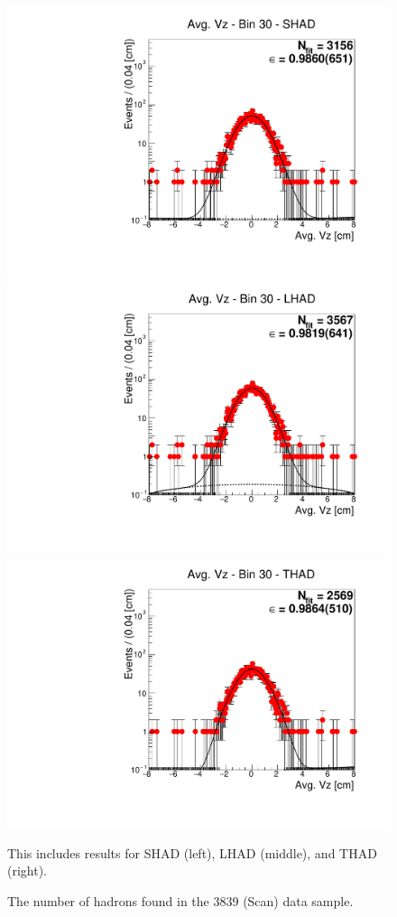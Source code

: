 \begin{figure}[H]
\centering
\includegraphics[scale=0.25]{figures/plots/nonDDbar_fit_results/scan/fit_scan_30_data_SHAD.pdf}
\hspace{-0.5cm}
\includegraphics[scale=0.25]{figures/plots/nonDDbar_fit_results/scan/fit_scan_30_data_LHAD.pdf}
\hspace{-0.5cm}
\includegraphics[scale=0.25]{figures/plots/nonDDbar_fit_results/scan/fit_scan_30_data_THAD.pdf}
\caption{The number of hadrons found in the 3839 (Scan) data sample.}
{This includes results for SHAD (left), LHAD (middle), and THAD (right).}
\label{fig:hadron_fits_scan_30}
\end{figure}

